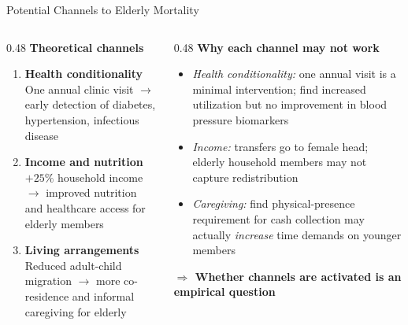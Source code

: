 \documentclass[aspectratio=169,usenames,dvipsnames]{beamer}
\newcommand{\smallcite}[1]{{\footnotesize\textcolor{Blue}{\citep{#1}}}}
\begin{document}
\begin{frame}{Potential Channels to Elderly Mortality}\label{channels}
\small
\begin{columns}[T]
  \begin{column}{0.48\textwidth}
    \textbf{Theoretical channels}
    \vspace{4pt}
    \begin{enumerate}
      \item \textbf{Health conditionality} \\
        One annual clinic visit $\to$ early detection of diabetes, hypertension, infectious disease
      \vspace{8pt}
      \item \textbf{Income and nutrition} \\
        $+25\%$ household income $\to$ improved nutrition and healthcare access for elderly members
      \vspace{8pt}
      \item \textbf{Living arrangements} \\
        Reduced adult-child migration $\to$ more co-residence and informal caregiving for elderly
    \end{enumerate}
  \end{column}
  \begin{column}{0.48\textwidth}
    \textbf{Why each channel may not work}
    \vspace{4pt}
    \begin{itemize}
      \item[$\circ$] \textit{Health conditionality:} one annual visit is a minimal intervention; \smallcite{aguila2024conditional} find increased utilization but no improvement in blood pressure biomarkers
      \vspace{4pt}
      \item[$\circ$] \textit{Income:} transfers go to female head; elderly household members may not capture redistribution
      \vspace{4pt}
      \item[$\circ$] \textit{Caregiving:} \smallcite{BehrmanParker2013Demography} find physical-presence requirement for cash collection may actually \textit{increase} time demands on younger members
    \end{itemize}
    \vspace{8pt}
    \textbf{$\Rightarrow$ Whether channels are activated is an empirical question}
  \end{column}
\end{columns}
\end{frame}
\end{document}
